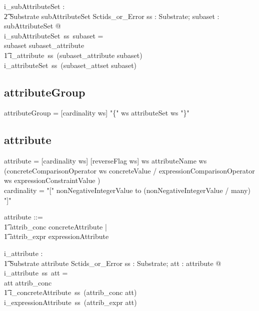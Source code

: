 \documentclass{article}
\def\bnf#1{{\scriptsize {{#1}} }}
\begin{document}
\begin{gendef}
   i\_subAttributeSet : \\
\t2 Substrate \fun subAttributeSet \fun Sctids\_or\_Error
\where
   \forall ss : Substrate; subaset : subAttributeSet @ \\
   i\_subAttributeSet~ss~subaset = \\
   \IF subaset \in \ran subaset\_attribute \\
\t1 \THEN i\_attribute~ss~(subaset\_attribute \inv subaset) \\
  \ELSE i\_attributeSet~ss~(subaset\_attset \inv subaset)
\end{gendef}

\subsection{attributeGroup}
\begin{framed}
\noindent
\bnf{attributeGroup = [cardinality ws] "\{" ws attributeSet ws "\}"}
\end{framed}


\subsection{attribute}
\begin{framed}
\noindent
\bnf{attribute = [cardinality ws] [reverseFlag ws] ws attributeName ws 
	(concreteComparisonOperator ws concreteValue / 
	expressionComparisonOperator ws expressionConstraintValue )} \\
\bnf{cardinality = "[" nonNegativeIntegerValue to (nonNegativeIntegerValue / many) "]" }
\end{framed}


\begin{zed}
   attribute ::= \\
\t1 attrib\_conc \ldata concreteAttribute \rdata | \\
\t1 attrib\_expr \ldata expressionAttribute \rdata
\end{zed}

\begin{gendef}
   i\_attribute : \\
\t1 Substrate \fun attribute \fun Sctids\_or\_Error
\where
   \forall ss : Substrate; att : attribute @ \\
   i\_attribute~ss~att = \\
   \IF att \in \ran attrib\_conc \\
\t1 \THEN i\_concreteAttribute~ss~(attrib\_conc \inv att) \\
   \ELSE i\_expressionAttribute~ss~(attrib\_expr \inv att)
\end{gendef}
\end{document}
